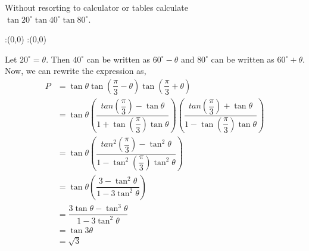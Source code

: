 

\question[4] Without resorting to calculator or tables calculate \\
$\tan20^\circ\tan40^\circ\tan80^\circ$.


\ifprintanswers
  \begin{marginfigure}
      :(0,0)
      :(0,0)
    \figdrawbegin{}
      \figdrawline [100,101]
    \figdrawend
    \figvisu{\figBoxA}{}{%
    }
    \centerline{\box\figBoxA}
  \end{marginfigure}
\fi 


\begin{solution}[\halfpage]
  Let $20^\circ=\theta$. Then $40^\circ$ can be written as $60^\circ -\theta$ and $80^\circ$ can be written as $60^\circ +\theta$. Now, we can rewrite the expression as,
  \begin{align}
    P &= \tan\theta\tan(\dfrac{\pi}{3}-\theta)
    	   \tan(\dfrac{\pi}{3}+\theta) \\
      &= \tan\theta
           \left(\dfrac{tan(\dfrac{\pi}{3})-\tan\theta}
                       {1+\tan(\dfrac{\pi}{3})\tan\theta}\right)
           \left(\dfrac{tan(\dfrac{\pi}{3})+\tan\theta}
                       {1-\tan(\dfrac{\pi}{3})\tan\theta}\right) \\
      &= \tan\theta
           \left(\dfrac{tan^2(\dfrac{\pi}{3})-\tan^2\theta}
                       {1-\tan^2(\dfrac{\pi}{3})\tan^2\theta}\right) \\
      &= \tan\theta
           \left(\dfrac{3-\tan^2\theta}
                       {1-3\tan^2\theta}\right) \\
      &= \dfrac{3\tan\theta-\tan^3\theta}{1-3\tan^2\theta} \\
      &= \tan 3\theta \\
      &= \sqrt{3}
  \end{align}
  
\end{solution}
